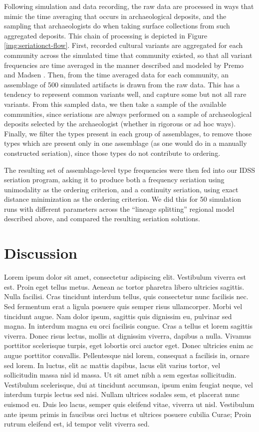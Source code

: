 \documentclass[graybox,natbib]{svmult}
\begin{document}
Following simulation and data recording, the raw data are processed in
ways that mimic the time averaging that occurs in archaeological
deposits, and the sampling that archaeologists do when taking surface
collections from such aggregated deposits. This chain of processing is
depicted in Figure \ref{img:seriationct-flow}. First, recorded cultural
variants are aggregated for each community across the simulated time
that community existed, so that all variant frequencies are time
averaged in the manner described and modeled by Premo
\citeyearpar{Premo2014} and Madsen \citeyearpar{Madsen2012}. Then, from
the time averaged data for each community, an assemblage of 500
simulated artifacts is drawn from the raw data. This has a tendency to
represent common variants well, and capture some but not all rare
variants. From this sampled data, we then take a sample of the available
communities, since seriations are always performed on a sample of
archaeological deposits selected by the archaeologist (whether in
rigorous or ad hoc ways). Finally, we filter the types present in each
group of assemblages, to remove those types which are present only in
one assemblage (as one would do in a manually constructed seriation),
since those types do not contribute to ordering.

The resulting set of assemblage-level type frequencies were then fed
into our IDSS seriation program, asking it to produce both a frequency
seriation using unimodality as the ordering criterion, and a continuity
seriation, using exact distance minimization as the ordering criterion.
We did this for 50 simulation runs with different parameters across the
``lineage splitting'' regional model described above, and compared the
resulting seriation solutions.

\section{Discussion}\label{discussion}

Lorem ipsum dolor sit amet, consectetur adipiscing elit. Vestibulum
viverra est est. Proin eget tellus metus. Aenean ac tortor pharetra
libero ultricies sagittis. Nulla facilisi. Cras tincidunt interdum
tellus, quis consectetur nunc facilisis nec. Sed fermentum erat a ligula
posuere quis semper risus ullamcorper. Morbi vel tincidunt augue. Nam
dolor ipsum, sagittis quis dignissim eu, pulvinar sed magna. In interdum
magna eu orci facilisis congue. Cras a tellus et lorem sagittis viverra.
Donec risus lectus, mollis at dignissim viverra, dapibus a nulla.
Vivamus porttitor scelerisque turpis, eget lobortis orci auctor eget.
Donec ultricies enim ac augue porttitor convallis. Pellentesque nisl
lorem, consequat a facilisis in, ornare sed lorem. In luctus, elit ac
mattis dapibus, lacus elit varius tortor, vel sollicitudin massa nisl id
massa. Ut sit amet nibh a sem egestas sollicitudin. Vestibulum
scelerisque, dui at tincidunt accumsan, ipsum enim feugiat neque, vel
interdum turpis lectus sed nisi. Nullam ultrices sodales sem, et
placerat nunc euismod eu. Duis leo lacus, semper quis eleifend vitae,
viverra ut nisl. Vestibulum ante ipsum primis in faucibus orci luctus et
ultrices posuere cubilia Curae; Proin rutrum eleifend est, id tempor
velit viverra sed.





\end{document}
